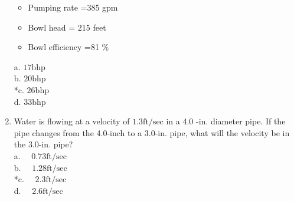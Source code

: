 \begin{enumerate}
\begin{itemize}
  \item Pumping rate =385 gpm\\
  \item Bowl head = 215 feet\\
  \item Bowl efficiency =81 \%\\
  \end{itemize}
a. $17 \mathrm{bhp}$\\
b. $20 \mathrm{bhp}$\\
*c. $26 \mathrm{bhp}$\\
d. $33 \mathrm{bhp}$\\
\item Water is flowing at a velocity of $1.3 \mathrm{ft} / \mathrm{sec}$ in a 4.0 -in. diameter pipe. If the pipe changes from the 4.0-inch to a 3.0-in. pipe, what will the velocity be in the 3.0-in. pipe?\\
a. $\quad 0.73 \mathrm{ft} / \mathrm{sec}$\\
b. $\quad 1.28 \mathrm{ft} / \mathrm{sec}$\\
*c. $\quad 2.3 \mathrm{ft} / \mathrm{sec}$\\
d. $\quad 2.6 \mathrm{ft} / \mathrm{sec}$\\


\end{enumerate}
